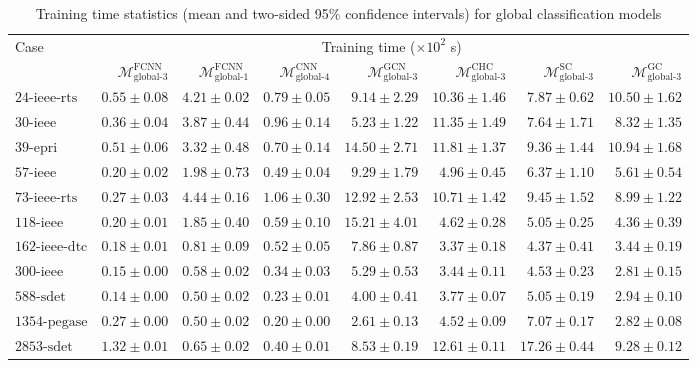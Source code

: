 \documentclass[journal]{IEEEtran}
\begin{document}
\begin{table*}[!ht]
\small
\caption{Training time statistics (mean and two-sided 95\% confidence intervals) for global classification models}
\label{tab:train_times_clf_global}
\def\na{---}
\centering
    \begin{tabular}{lr|rrrrrr}
    \toprule
    \multirow{2}{*}{Case} & \multicolumn{7}{c}{Training time ($\times 10^{2}$ s)} \\
    \cmidrule(r){2-8}
    & $\mathcal{M}^{\textrm{FCNN}}_{\textrm{global-3}}$ & $\mathcal{M}^{\textrm{FCNN}}_{\textrm{global-1}}$ & $\mathcal{M}^{\textrm{CNN}}_{\textrm{global-4}}$ & $\mathcal{M}^{\textrm{GCN}}_{\textrm{global-3}}$ & $\mathcal{M}^{\textrm{CHC}}_{\textrm{global-3}}$ & $\mathcal{M}^{\textrm{SC}}_{\textrm{global-3}}$ & $\mathcal{M}^{\textrm{GC}}_{\textrm{global-3}}$ \\
    \midrule
    $\textrm{24-ieee-rts}$ & $0.55 \pm 0.08$ & $4.21 \pm 0.02$ & ${0.79} \pm {0.05}$ & $9.14 \pm 2.29$ & $10.36 \pm 1.46$ & $7.87 \pm 0.62$ & $10.50 \pm 1.62$ \\
    $\textrm{30-ieee}$ & $0.36 \pm 0.04$ & $3.87 \pm 0.44$ & ${0.96} \pm {0.14}$ & $5.23 \pm 1.22$ & $11.35 \pm 1.49$ & $7.64 \pm 1.71$ & $8.32 \pm 1.35$ \\
    $\textrm{39-epri}$ & $0.51 \pm 0.06$ & $3.32 \pm 0.48$ & ${0.70} \pm {0.14}$ & $14.50 \pm 2.71$ & $11.81 \pm 1.37$ & $9.36 \pm 1.44$ & $10.94 \pm 1.68$ \\
    $\textrm{57-ieee}$ & $0.20 \pm 0.02$ & $1.98 \pm 0.73$ & ${0.49} \pm {0.04}$ & $9.29 \pm 1.79$ & $4.96 \pm 0.45$ & $6.37 \pm 1.10$ & $5.61 \pm 0.54$ \\
    $\textrm{73-ieee-rts}$ & $0.27 \pm 0.03$ & $4.44 \pm 0.16$ & ${1.06} \pm {0.30}$ & $12.92 \pm 2.53$ & $10.71 \pm 1.42$ & $9.45 \pm 1.52$ & $8.99 \pm 1.22$ \\
    $\textrm{118-ieee}$ & $0.20 \pm 0.01$ & $1.85 \pm 0.40$ & ${0.59} \pm {0.10}$ & $15.21 \pm 4.01$ & $4.62 \pm 0.28$ & $5.05 \pm 0.25$ & $4.36 \pm 0.39$ \\
    $\textrm{162-ieee-dtc}$ & $0.18 \pm 0.01$ & $0.81 \pm 0.09$ & ${0.52} \pm {0.05}$ & $7.86 \pm 0.87$ & $3.37 \pm 0.18$ & $4.37 \pm 0.41$ & $3.44 \pm 0.19$ \\
    $\textrm{300-ieee}$ & $0.15 \pm 0.00$ & $0.58 \pm 0.02$ & ${0.34} \pm {0.03}$ & $5.29 \pm 0.53$ & $3.44 \pm 0.11$ & $4.53 \pm 0.23$ & $2.81 \pm 0.15$ \\
    $\textrm{588-sdet}$ & $0.14 \pm 0.00$ & $0.50 \pm 0.02$ & ${0.23} \pm {0.01}$ & $4.00 \pm 0.41$ & $3.77 \pm 0.07$ & $5.05 \pm 0.19$ & $2.94 \pm 0.10$ \\
    $\textrm{1354-pegase}$ & $0.27 \pm 0.00$ & $0.50 \pm 0.02$ & ${0.20} \pm {0.00}$ & $2.61 \pm 0.13$ & $4.52 \pm 0.09$ & $7.07 \pm 0.17$ & $2.82 \pm 0.08$ \\
    $\textrm{2853-sdet}$ & $1.32 \pm 0.01$ & $0.65 \pm 0.02$ & ${0.40} \pm {0.01}$ & $8.53 \pm 0.19$ & $12.61 \pm 0.11$ & $17.26 \pm 0.44$ & $9.28 \pm 0.12$ \\
    \bottomrule
    \end{tabular}
\end{table*}
\end{document}
